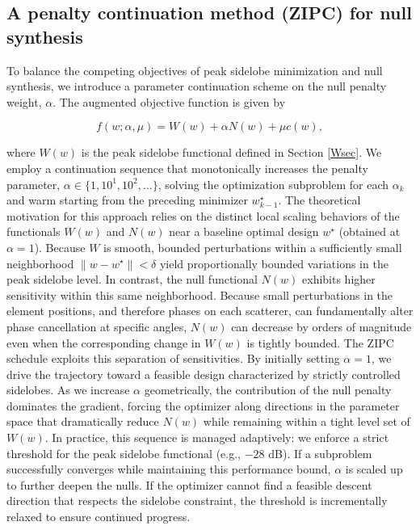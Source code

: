 \documentclass[11pt,letterpaper]{article}
\theoremstyle{definition}
\theoremstyle{plain}
\begin{document}
\subsection{A penalty continuation method (ZIPC) for null synthesis}

To balance the competing objectives of peak sidelobe minimization and null synthesis, we introduce a parameter continuation scheme on the null penalty weight, $\alpha$. The augmented objective function is given by

$$f(w;\alpha,\mu)=W(w)+\alpha N(w)+\mu c(w),$$

where $W(w)$ is the peak sidelobe functional defined in Section \ref{Wsec}. We employ a continuation sequence that monotonically increases the penalty parameter, $\alpha\in\{1,10^1,10^2,\dots\}$, solving the optimization subproblem for each $\alpha_{k}$ and warm starting from the preceding minimizer $w_{k-1}^\star$. The theoretical motivation for this approach relies on the distinct local scaling behaviors of the functionals $W(w)$ and $N(w)$ near a baseline optimal design $w^\star$ (obtained at $\alpha=1$). Because $W$ is smooth, bounded perturbations within a sufficiently small neighborhood $\|w-w^\star\|<\delta$ yield proportionally bounded variations in the peak sidelobe level. In contrast, the null functional $N(w)$ exhibits higher sensitivity within this same neighborhood. Because small perturbations in the element positions, and therefore phases on each scatterer, can fundamentally alter phase cancellation at specific angles, $N(w)$ can decrease by orders of magnitude even when the corresponding change in $W(w)$ is tightly bounded. The ZIPC schedule exploits this separation of sensitivities. By initially setting $\alpha=1$, we drive the trajectory toward a feasible design characterized by strictly controlled sidelobes. As we increase $\alpha$ geometrically, the contribution of the null penalty dominates the gradient, forcing the optimizer along directions in the parameter space that dramatically reduce $N(w)$ while remaining within a tight level set of $W(w)$. In practice, this sequence is managed adaptively: we enforce a strict threshold for the peak sidelobe functional (e.g., $-28$ dB). If a subproblem successfully converges while maintaining this performance bound, $\alpha$ is scaled up to further deepen the nulls. If the optimizer cannot find a feasible descent direction that respects the sidelobe constraint, the threshold is incrementally relaxed to ensure continued progress.
\end{document}
